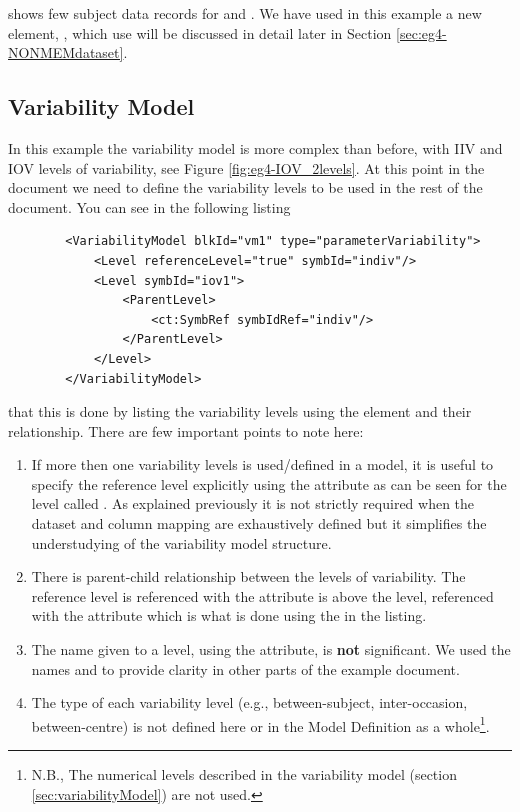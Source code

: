 shows few subject data records for  and . We have used 
in this example a new element, , which use will be 
discussed in detail later in Section \ref{sec:eg4-NONMEMdataset}.


\subsection{Variability Model}
\label{eg4:variabilityModel}

In this example the variability model is more complex than before, with IIV 
and IOV levels of variability, see Figure \ref{fig:eg4-IOV_2levels}. 
At this point in the \pharmml document we need to define the variability levels to be 
used in the rest of the document. You can see in the following listing 
\lstset{language=XML}
\begin{lstlisting}
        <VariabilityModel blkId="vm1" type="parameterVariability">
            <Level referenceLevel="true" symbId="indiv"/>
            <Level symbId="iov1">
                <ParentLevel>
                    <ct:SymbRef symbIdRef="indiv"/>
                </ParentLevel>
            </Level>
        </VariabilityModel>
\end{lstlisting}

that this is done by listing the variability levels using the  
element and their relationship. There are few important points to note here:
\begin{enumerate}
\item 
If more then one variability levels is used/defined in a model, it is useful to specify 
the reference level explicitly using the attribute  as can be seen
for the level called . As explained previously it is not strictly required when
the dataset and column mapping are exhaustively defined but it simplifies the 
understudying of the variability model structure.
\item There is parent-child relationship between the levels of variability. The reference 
 level is referenced with the attribute  is above the 
 level, referenced with the attribute  which is  
what is done using the  in the listing.
\item The name given to a level, using the  attribute, is \textbf{not} 
significant. We used the names  and  to provide clarity in other 
parts of the example document.
\item The type of each variability level (e.g.,\xspace between-subject, inter-occasion, 
between-centre) is not defined here or in the Model Definition as a 
whole\footnote{N.B.,\xspace The numerical levels described in the variability 
model (section \ref{sec:variabilityModel}) are not used.}.
\end{enumerate}

